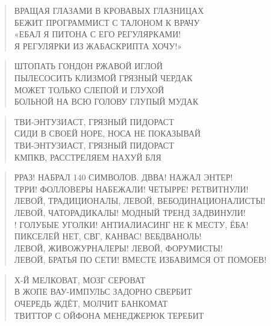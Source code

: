 \poemtitle{***}
\begin{verse}
ВРАЩАЯ ГЛАЗАМИ В КРОВАВЫХ ГЛАЗНИЦАХ\\
БЕЖИТ ПРОГРАММИСТ С ТАЛОНОМ К ВРАЧУ\\
«ЕБАЛ Я ПИТОНА С ЕГО РЕГУЛЯРКАМИ!\\
Я РЕГУЛЯРКИ ИЗ ЖАБАСКРИПТА ХОЧУ!»
\end{verse}

\poemtitle{***}
\begin{verse}
ШТОПАТЬ ГОНДОН РЖАВОЙ ИГЛОЙ\\
ПЫЛЕСОСИТЬ КЛИЗМОЙ ГРЯЗНЫЙ ЧЕРДАК\\
МОЖЕТ ТОЛЬКО СЛЕПОЙ И ГЛУХОЙ\\
БОЛЬНОЙ НА ВСЮ ГОЛОВУ ГЛУПЫЙ МУДАК
\end{verse}

\poemtitle{***}
\begin{verse}
ТВИ-ЭНТУЗИАСТ, ГРЯЗНЫЙ ПИДОРАСТ\\
СИДИ В СВОЕЙ НОРЕ, НОСА НЕ ПОКАЗЫВАЙ\\
ТВИ-ЭНТУЗИАСТ, ГРЯЗНЫЙ ПИДОРАСТ\\
КМПКВ, РАССТРЕЛЯЕМ НАХУЙ БЛЯ
\end{verse}

\poemtitle{***}
\begin{verse}
РРАЗ! НАБРАЛ 140 СИМВОЛОВ. ДВВА! НАЖАЛ ЭНТЕР!\\
ТРРИ! ФОЛЛОВЕРЫ НАБЕЖАЛИ! ЧЕТЫРРЕ! РЕТВИТНУЛИ!\\
ЛЕВОЙ, ТРАДИЦИОНАЛЫ, ЛЕВОЙ, ВЕБОДИНАЦИОНАЛИСТЫ!\\
ЛЕВОЙ, ЧАТОРАДИКАЛЫ! МОДНЫЙ ТРЕНД ЗАДВИНУЛИ!\\!
ГОЛУБЫЕ УГОЛКИ! АНТИАЛИАСИНГ НЕ К МЕСТУ, ЁБА!\\
ПИКСЕЛЕЙ НЕТ, СВГ, КАНВАС! ВЕБДВАНОЛЬ!\\
ЛЕВОЙ, ЖИВОЖУРНАЛЕРЫ! ЛЕВОЙ, ФОРУМИСТЫ!\\
ЛЕВОЙ, БРАТЬЯ ПО СЕТИ! ВМЕСТЕ ИЗБАВИМСЯ ОТ ПОМОЕВ!
\end{verse}

\poemtitle{***}
\begin{verse}
Х-Й МЕЛКОВАТ, МОЗГ СЕРОВАТ\\
В ЖОПЕ ВАУ-ИМПУЛЬС ЗАДОРНО СВЕРБИТ\\
ОЧЕРЕДЬ ЖДЁТ, МОЛЧИТ БАНКОМАТ\\
ТВИТТОР С ОЙФОНА МЕНЕДЖЕРЮК ТЕРЕБИТ
\end{verse}

